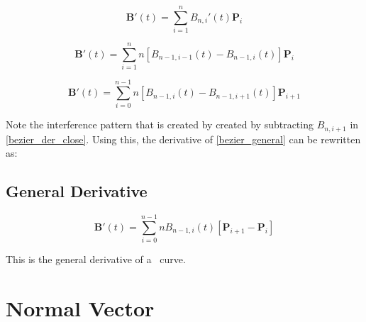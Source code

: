 \documentclass[oneside]{article}
\begin{document}
\[ \mathbf{B}'(t) = \sum_{i=1}^{n} B_{n,i}'(t) \mathbf{P}_i \]

\[ \mathbf{B}'(t) = \sum_{i=1}^{n} n [ B_{n-1,i-1}(t) - B_{n-1,i}(t) ] \mathbf{P}_i \]

\begin{equation}\label{bezier_der_close}
	\mathbf{B}'(t) = \sum_{i=0}^{n-1} n [ B_{n-1,i}(t) - B_{n-1,i+1}(t) ] \mathbf{P}_{i+1}
\end{equation}

Note the interference pattern that is created by created by subtracting $B_{n,i+1}$ in \eqref{bezier_der_close}.  Using this, the derivative of \eqref{bezier_general} can be rewritten as:

\subsection{General Derivative}

\begin{equation}\label{bezier_deriv}
	\mathbf{B}'(t) = \sum_{i=0}^{n-1} n B_{n-1,i}(t) [ \mathbf{P}_{i+1} - \mathbf{P}_i ]
\end{equation}

This is the general derivative of a \Bezier\ curve.

\section{Normal Vector}
\end{document}
